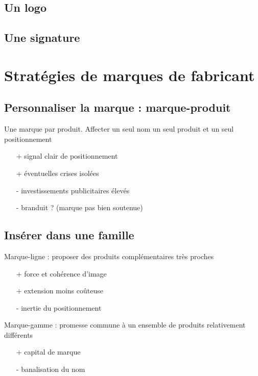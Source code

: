 		
		\subsection{Un logo}
		
		\subsection{Une signature}
		
		
	\section{Stratégies de marques de fabricant}
		
		\subsection{Personnaliser la marque : marque-produit}
		
		Une marque par produit. Affecter un seul nom  un seul produit et un seul positionnement
			
			\begin{itemize}
				\item[+] signal clair de positionnement
				\item[+] éventuelles crises isolées
				\item[-] investissements publicitaires élevés
				\item[-] branduit ? (marque pas bien soutenue)
			\end{itemize}
			
		\subsection{Insérer dans une famille}
		
		
		Marque-ligne : proposer des produits complémentaires très proches
		\begin{itemize}
			\item[+] force et cohérence d'image
			\item[+] extension moins coûteuse
			\item[-] inertie du positionnement
		\end{itemize}
		
		
		Marque-gamme : promesse commune à un ensemble de produits relativement différents
		
		\begin{itemize}
			\item[+] capital de marque
			\item[-] banalisation du nom				
		\end{itemize}
		
